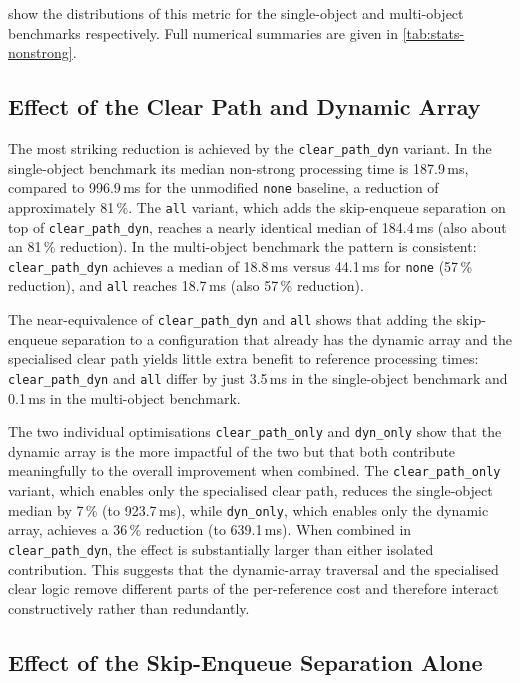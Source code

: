  show the distributions of this metric for the single-object and multi-object benchmarks respectively. Full numerical summaries are given in \cref{tab:stats-nonstrong}.

\subsection{Effect of the Clear Path and Dynamic Array}
\label{subsec:analysis-nonstrong-clear-dyn}

The most striking reduction is achieved by the \texttt{clear\_path\_dyn} variant. In the single-object benchmark its median non-strong processing time is 187.9\,ms, compared to 996.9\,ms for the unmodified \texttt{none} baseline, a reduction of approximately 81\,\%. The \texttt{all} variant, which adds the skip-enqueue separation on top of \texttt{clear\_path\_dyn}, reaches a nearly identical median of 184.4\,ms (also about an 81\,\% reduction). In the multi-object benchmark the pattern is consistent: \texttt{clear\_path\_dyn} achieves a median of 18.8\,ms versus 44.1\,ms for \texttt{none} (57\,\% reduction), and \texttt{all} reaches 18.7\,ms (also 57\,\% reduction).

The near-equivalence of \texttt{clear\_path\_dyn} and \texttt{all} shows that adding the skip-enqueue separation to a configuration that already has the dynamic array and the specialised clear path yields little extra benefit to reference processing times: \texttt{clear\_path\_dyn} and \texttt{all} differ by just 3.5\,ms in the single-object benchmark and 0.1\,ms in the multi-object benchmark.

The two individual optimisations \texttt{clear\_path\_only} and \texttt{dyn\_only} show that the dynamic array is the more impactful of the two but that both contribute meaningfully to the overall improvement when combined. The \texttt{clear\_path\_only} variant, which enables only the specialised clear path, reduces the single-object median by 7\,\% (to 923.7\,ms), while \texttt{dyn\_only}, which enables only the dynamic array, achieves a 36\,\% reduction (to 639.1\,ms). When combined in \texttt{clear\_path\_dyn}, the effect is substantially larger than either isolated contribution. This suggests that the dynamic-array traversal and the specialised clear logic remove different parts of the per-reference cost and therefore interact constructively rather than redundantly.

\subsection{Effect of the Skip-Enqueue Separation Alone}
\label{subsec:analysis-nonstrong-sep}

